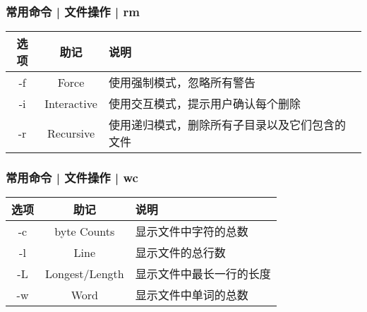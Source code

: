 \begin{frame}[fragile]
  \frametitle{常用命令 | 文件操作 | \alert{rm}}
  \begin{table}
    \centering
    \begin{tabularx}{0.9\textwidth}{ccX}
      \hline
      \rowcolor{blue!50}选项 & 助记 & 说明\\
      \hline
      -f & Force & 使用强制模式，忽略所有警告\\
      -i & Interactive & 使用交互模式，提示用户确认每个删除\\
      -r & Recursive & 使用递归模式，删除所有子目录以及它们包含的文件\\
      \hline
    \end{tabularx}
  \end{table}
\end{frame}

\begin{frame}[fragile]
  \frametitle{常用命令 | 文件操作 | \alert{wc}}
  \begin{table}
    \centering
    \begin{tabularx}{0.9\textwidth}{ccX}
      \hline
      \rowcolor{blue!50}选项 & 助记 & 说明\\
      \hline
      -c & byte Counts & 显示文件中字符的总数\\
      -l & Line & 显示文件的总行数\\
      -L & Longest/Length & 显示文件中最长一行的长度\\
      -w & Word & 显示文件中单词的总数\\
      \hline
    \end{tabularx}
  \end{table}
\end{frame}

